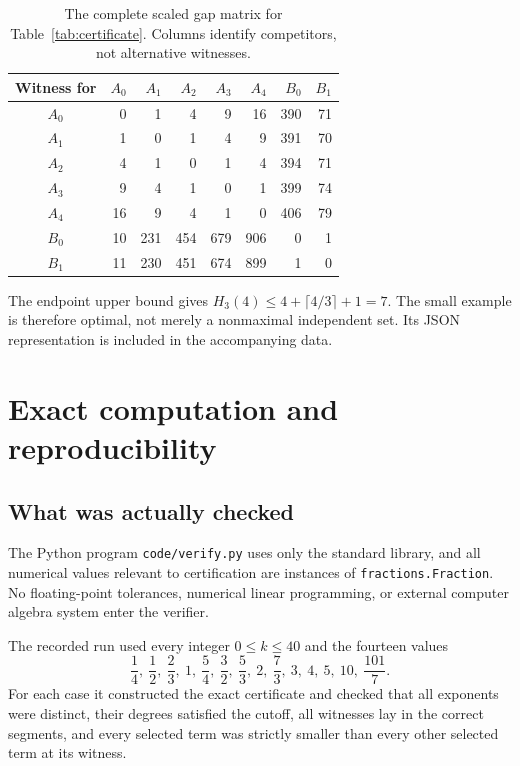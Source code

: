 \documentclass[11pt,a4paper]{article}
\numberwithin{equation}{section}
\theoremstyle{definition}
\theoremstyle{remark}
\begin{document}
\begin{table}[ht]
\centering
\renewcommand{\arraystretch}{1.15}
\begin{tabular}{@{}c rrrrrrr@{}}
\toprule
Witness for & $A_0$ & $A_1$ & $A_2$ & $A_3$ & $A_4$ & $B_0$ & $B_1$\\
\midrule
$A_0$ &0&1&4&9&16&390&71\\
$A_1$ &1&0&1&4&9&391&70\\
$A_2$ &4&1&0&1&4&394&71\\
$A_3$ &9&4&1&0&1&399&74\\
$A_4$ &16&9&4&1&0&406&79\\
$B_0$ &10&231&454&679&906&0&1\\
$B_1$ &11&230&451&674&899&1&0\\
\bottomrule
\end{tabular}
\caption{The complete scaled gap matrix for Table~\ref{tab:certificate}.
Columns identify competitors, not alternative witnesses.}
\label{tab:gaps}
\end{table}

The endpoint upper bound gives $H_3(4)\leq4+\lceil4/3\rceil+1=7$.
The small example is therefore optimal, not merely a nonmaximal independent
set. Its JSON representation is included in the accompanying data.

\section{Exact computation and reproducibility}
\label{sec:computation}

\subsection{What was actually checked}

The Python program \texttt{code/verify.py} uses only the standard library,
and all numerical values relevant to certification are instances of
\texttt{fractions.Fraction}. No floating-point tolerances, numerical linear
programming, or external computer algebra system enter the verifier.

The recorded run used every integer $0\leq k\leq40$ and the fourteen values
\[
\frac14,\ \frac12,\ \frac23,\ 1,\ \frac54,\ \frac32,\ \frac53,\ 2,\
\frac73,\ 3,\ 4,\ 5,\ 10,\ \frac{101}{7}.
\]
For each case it constructed the exact certificate and checked that all
exponents were distinct, their degrees satisfied the cutoff, all witnesses
lay in the correct segments, and every selected term was strictly smaller
than every other selected term at its witness.
\end{document}
